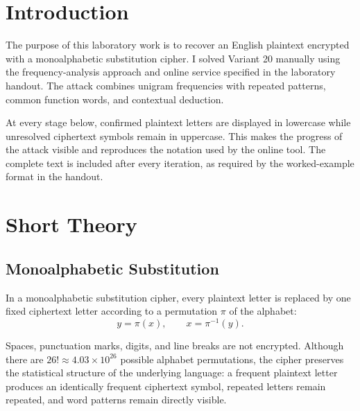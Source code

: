 \documentclass[11pt,a4paper]{article}
\begin{document}
\setcounter{page}{2}
\tableofcontents
\newpage

\section*{Introduction}

The purpose of this laboratory work is to recover an English plaintext encrypted with a monoalphabetic substitution cipher. I solved Variant 20 manually using the frequency-analysis approach and online service specified in the laboratory handout. The attack combines unigram frequencies with repeated patterns, common function words, and contextual deduction.

At every stage below, confirmed plaintext letters are displayed in lowercase while unresolved ciphertext symbols remain in uppercase. This makes the progress of the attack visible and reproduces the notation used by the online tool. The complete text is included after every iteration, as required by the worked-example format in the handout.

\newpage
\section{Short Theory}

\subsection{Monoalphabetic Substitution}

In a monoalphabetic substitution cipher, every plaintext letter is replaced by one fixed ciphertext letter according to a permutation $\pi$ of the alphabet:
\begin{equation}
  y = \pi(x), \qquad x = \pi^{-1}(y).
\end{equation}

Spaces, punctuation marks, digits, and line breaks are not encrypted. Although there are $26! \approx 4.03 \times 10^{26}$ possible alphabet permutations, the cipher preserves the statistical structure of the underlying language: a frequent plaintext letter produces an identically frequent ciphertext symbol, repeated letters remain repeated, and word patterns remain directly visible.
\end{document}
